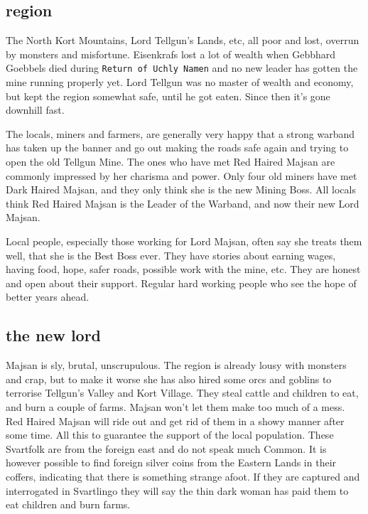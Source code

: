 \subsection*{region}
The North Kort Mountains, Lord Tellgun's Lands, etc, all poor and lost, overrun by monsters and misfortune. Eisenkrafs lost a lot of wealth when Gebbhard Goebbels died during \texttt{Return of Uchly Namen} and no new leader has gotten the mine running properly yet. Lord Tellgun was no master of wealth and economy, but kept the region somewhat safe, until he got eaten. Since then it's gone downhill fast.

The locals, miners and farmers, are generally very happy that a strong warband has taken up the banner and go out making the roads safe again and trying to open the old Tellgun Mine. The ones who have met Red Haired Majsan are commonly impressed by her charisma and power. Only four old miners have met Dark Haired Majsan, and they only think she is the new Mining Boss. All locals think Red Haired Majsan is the Leader of the Warband, and now their new Lord Majsan.

Local people, especially those working for Lord Majsan, often say she treats them well, that she is the Best Boss ever. They have stories about earning wages, having food, hope, safer roads, possible work with the mine, etc. They are honest and open about their support. Regular hard working people who see the hope of better years ahead.


\subsection*{the new lord}
Majsan is sly, brutal, unscrupulous. The region is already lousy with monsters and crap, but to make it worse she has also hired some orcs and goblins to terrorise Tellgun's Valley and Kort Village. They steal cattle and children to eat, and burn a couple of farms. Majsan won't let them make too much of a mess. Red Haired Majsan will ride out and get rid of them in a showy manner after some time. All this to guarantee the support of the local population. These Svartfolk are from the foreign east and do not speak much Common. It is however possible to find foreign silver coins from the Eastern Lands in their coffers, indicating that there is something strange afoot. If they are captured and interrogated in Svartlingo they will say the thin dark woman has paid them to eat children and burn farms.

